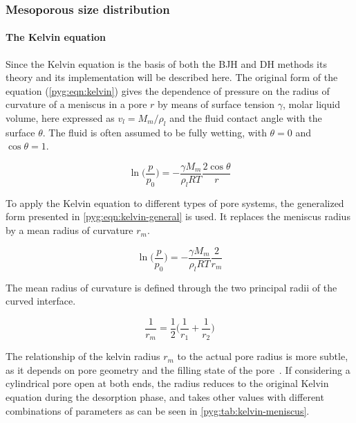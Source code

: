 \subsubsection{Mesoporous size distribution}

\paragraph{The Kelvin equation}

Since the Kelvin equation is the basis of both the BJH and DH methods
its theory and its implementation will be described here. The original
form of the equation (\autoref{pyg:eqn:kelvin}) gives the dependence
of pressure on the radius of curvature of a meniscus in a pore \(r\) by
means of surface tension \(\gamma\), molar liquid volume, here expressed
as \(v_l=M_m/\rho_l\) and the fluid contact angle with the surface
\(\theta\). The fluid is often assumed to be fully wetting, with
\(\theta=0\) and \(\cos\theta=1\).

\begin{equation}\label{pyg:eqn:kelvin}
	\ln\Big(\frac{p}{p_0}\Big) = -\frac{\gamma M_m}{\rho_l RT}\frac{2 \cos\theta}{r}
\end{equation}

To apply the Kelvin equation to different types of pore systems, the
generalized form presented in \autoref{pyg:eqn:kelvin-general}
is used. It replaces the meniscus radius by a mean radius of curvature
\(r_m\).

\begin{equation}\label{pyg:eqn:kelvin-general}
	\ln\Big(\frac{p}{p_0}\Big) = -\frac{\gamma M_m}{\rho_l RT}\frac{2}{r_m}
\end{equation}

The mean radius of curvature is defined through the two principal
radii of the curved interface.

\begin{equation}\label{pyg:eqn:kelvin-mradius}
	\frac{1}{r_m} = \frac{1}{2}\Big(\frac{1}{r_1}+\frac{1}{r_2}\Big)
\end{equation}

The relationship of the kelvin radius \(r_m\) to the actual pore
radius is more subtle, as it depends on pore geometry and the
filling state of the pore~\cite{doAdsorptionAnalysisEquilibria1998}.
If considering a cylindrical pore open at both ends, the radius reduces
to the original Kelvin equation during the desorption phase, and takes
other values with different combinations of parameters
as can be seen in \autoref{pyg:tab:kelvin-meniscus}.

